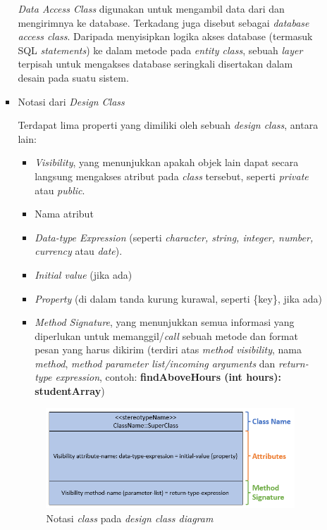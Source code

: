 \documentclass[a4paper]{article}
\begin{document}
\begin{enumerate}
\begin{enumerate}
\begin{itemize}
            \textit{Data Access Class} digunakan untuk mengambil data dari dan mengirimnya ke database. Terkadang juga disebut sebagai \textit{database access class}. Daripada menyisipkan logika akses database (termasuk SQL \textit{statements}) ke dalam metode pada \textit{entity class}, sebuah \textit{layer} terpisah untuk mengakses database seringkali disertakan dalam desain pada suatu sistem\autocite[376-382]{uml-satzinger}.

            \item Notasi dari \textit{Design Class}
            
            Terdapat lima properti yang dimiliki oleh sebuah \textit{design class}\autocite[376-382]{uml-satzinger}, antara lain:

            \begin{itemize}
                \item \textit{Visibility}, yang menunjukkan apakah objek lain dapat secara langsung mengakses atribut pada \textit{class} tersebut, seperti \textit{private} atau \textit{public}.
                \item Nama atribut
                \item \textit{Data-type Expression} (seperti \textit{character, string, integer, number, currency} atau \textit{date}).
                \item \textit{Initial value} (jika ada)
                \item \textit{Property} (di dalam tanda kurung kurawal, seperti \{key\}, jika ada)
                \item \textit{Method Signature}, yang menunjukkan semua informasi yang diperlukan untuk memanggil/\textit{call} sebuah metode dan format pesan yang harus dikirim (terdiri atas \textit{method visibility}, nama \textit{method}, \textit{method parameter list/incoming arguments} dan \textit{return-type expression}, contoh: \textbf{findAboveHours (int hours): studentArray})
            \end{itemize}

            \begin{figure}[h]
                \centering
                \includegraphics[scale=0.5]{images/uml satzinger/design class diagram/design class diagram notation.png}
                \caption{Notasi \textit{class} pada \textit{design class diagram}}
            \end{figure}


\end{itemize}
\end{enumerate}
\end{enumerate}
\end{document}
